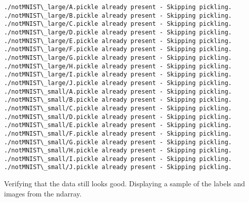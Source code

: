 \documentclass[11pt]{article}
\begin{document}
    \begin{Verbatim}[commandchars=\\\{\}]
./notMNIST\_large/A.pickle already present - Skipping pickling.
./notMNIST\_large/B.pickle already present - Skipping pickling.
./notMNIST\_large/C.pickle already present - Skipping pickling.
./notMNIST\_large/D.pickle already present - Skipping pickling.
./notMNIST\_large/E.pickle already present - Skipping pickling.
./notMNIST\_large/F.pickle already present - Skipping pickling.
./notMNIST\_large/G.pickle already present - Skipping pickling.
./notMNIST\_large/H.pickle already present - Skipping pickling.
./notMNIST\_large/I.pickle already present - Skipping pickling.
./notMNIST\_large/J.pickle already present - Skipping pickling.
./notMNIST\_small/A.pickle already present - Skipping pickling.
./notMNIST\_small/B.pickle already present - Skipping pickling.
./notMNIST\_small/C.pickle already present - Skipping pickling.
./notMNIST\_small/D.pickle already present - Skipping pickling.
./notMNIST\_small/E.pickle already present - Skipping pickling.
./notMNIST\_small/F.pickle already present - Skipping pickling.
./notMNIST\_small/G.pickle already present - Skipping pickling.
./notMNIST\_small/H.pickle already present - Skipping pickling.
./notMNIST\_small/I.pickle already present - Skipping pickling.
./notMNIST\_small/J.pickle already present - Skipping pickling.

    \end{Verbatim}

    Verifying that the data still looks good. Displaying a sample of the
labels and images from the ndarray.
\end{document}
